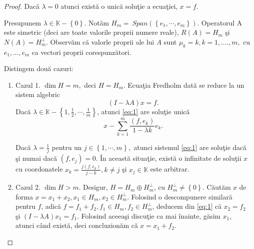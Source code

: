 \documentclass[a4paper,12pt,oneside]{report}
\begin{document}
\begin{proof}
Dac\u{a} \(\lambda = 0\) atunci exist\u{a} o unic\u{a} solu\c{t}ie a ecua\c{t}iei,  \(x = f\).

Presupunem \(\lambda \in \mathbb{K} - \left \{ 0 \right \}\). Not\u{a}m \(H _{m} = \ Span \left ( \left \{ e_{1},\cdots,e_{m} \right \} \right )\). Operatorul A este simetric (deci are toate valorile proprii numere reale), \(R\left ( A \right ) = H_{m}\) \c{s}i  \(N\left ( A \right ) = H_{m}^{\perp }\). Observ\u{a}m c\u{a} valorle proprii ale lui \(A\) sunt \(\mu _{k} = k, k = 1,....,m ,\) cu \(e_{1},...,e_{m}\) ca vectori proprii corespunz\u{a}tori.

\noindent Distingem dou\u{a} cazuri:
\begin{enumerate}
    \item  Cazul 1.
\(\dim H = m,\) deci \(H = H_{m}\). Ecua\c{t}ia Fredholm dat\u{a} se reduce la  un sistem algebric
\begin{displaymath}
  \left ( I - \lambda A \right )x = f. \label{eq:1} \tag{1}
\end{displaymath}
Dac\u{a} \(\lambda \in \mathbb{K} - \left \{ 1,\frac{1}{2},\cdots,\frac{1}{m} \right \}\), atunci \ref{eq:1} are solu\c{t}ie unic\u{a}
\begin{displaymath}
  x - \sum_{k = 1}^{m}\frac{\left ( f,e_{k} \right )}{1 - \lambda k}e_{k}.
\end{displaymath}
  	      			      	
Dac\u{a} \(\lambda  = \frac{1}{j}\) pentru un \(j \in \left \{ 1,\cdots,m \right \},\) atunci sistemul \ref{eq:1} are solu\c{t}ie dac\u{a} \c{s}i numai dac\u{a} \(\left ( f,e_{j} \right ) = 0\). \^{I}n aceast\u{a} situa\c{t}ie, exist\u{a} o infinitate de solu\c{t}ii \(x\) cu coordonatele \(x_{k} = \frac{j\left ( f,e_{k} \right )}{j-k }, k\neq j\) \c{s}i \(x_{j} \in \mathbb{K}\) este arbitrar.
\item Cazul 2.
\(\dim H > m\). Desigur, \(H = H_{m}\oplus H_{m}^{\perp }\), cu  \(H_{m}^{\perp }\neq \left \{ 0 \right \}\). C\u{a}ut\u{a}m \(x\) de forma \(x = x_{1} + x_{2}, x_{1} \in H_{m}, x_{2} \in H_{m}^{\perp }\). Folosind o descompunere similar\u{a} pentru \(f\), adic\u{a} \(f = f_{1} + f_{2}, f_{1} \in H_{m}, f_{2} \in H_{m}^{\perp }\), deducem din \ref{eq:1} c\u{a} \(x_{2} = f_{2}\) \c{s}i \(\left ( I - \lambda A \right )x _{1} = f_{1}\). Folosind aceea\c{s}i discu\c{t}ie ca mai \^{i}nainte,  g\u{a}sim \(x_{1}\), atunci c\^{a}nd exist\u{a}, deci concluzion\u{a}m c\u{a} \(x = x_{1} + f_{2}\).
\end{enumerate}
\end{proof}
  	      			      	
\end{document}
